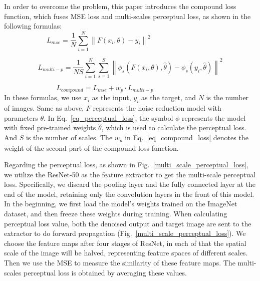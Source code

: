 \documentclass[conference]{IEEEtran}
\begin{document}
                In order to overcome the problem, this paper introduces the compound loss function, which fuses MSE loss and multi-scales perceptual loss, as shown in the following formulas: 
                \begin{equation}
                    L_{mse} = \frac{1}{N} \sum_{i=1}^N \left\| F\left(x_{i}, \theta\right) - y_{i} \right\|^{2} \qquad\qquad\qquad\qquad\quad \label{eq_mse_loss}
                \end{equation}
                \begin{small}
                    \begin{equation}
                        L_{multi-p} = \frac{1}{NS} \sum_{i=1}^{N} \sum_{s=1}^S \left\|\phi_s\left(F\left(x_{i}, \theta\right), \hat{\theta}\right)-\phi_s\left(y_{i}, \hat{\theta}\right)\right\|^{2} \label{eq_perceptual_loss}
                    \end{equation}
                \end{small}
                \begin{equation}
                    L_{compound} = L_{mse} + w_{p} \cdot L_{multi-p} \qquad\qquad\qquad\quad ~ \label{eq_compound_loss}
                \end{equation}
                In these formulas, we use $x_{i}$ as the input, $y_{i}$ as the target, and $N$ is the number of images.
                Same as above, $F$ represents the noise reduction model with parameters $\theta$.
                In Eq.~\ref{eq_perceptual_loss}, the symbol $\phi$ represents the model with fixed pre-trained weights $\hat{\theta}$, which is used to calculate the perceptual loss.
                And $S$ is the number of scales. 
                The $w_{p}$ in Eq.~\ref{eq_compound_loss} denotes the weight of the second part of the compound loss function.

                Regarding the perceptual loss, as shown in Fig.~\ref{multi_scale_perceptual_loss}, we utilize the ResNet-50\cite{He_2016_CVPR} as the feature extractor to get the multi-scale perceptual loss.
                Specifically, we discard the pooling layer and the fully connected layer at the end of the model, retaining only the convolution layers in the front of this model.
                In the beginning, we first load the model's weights trained on the ImageNet dataset\cite{5206848}, and then freeze these weights during training.
                When calculating perceptual loss value, both the denoised output and target image are sent to the extractor to do forward propagation (Fig.~\ref{multi_scale_perceptual_loss}).
                We choose the feature maps after four stages of ResNet, in each of that the spatial scale of the image will be halved, representing feature spaces of different scales.
                Then we use the MSE to measure the similarity of these feature maps.
                The multi-scales perceptual loss is obtained by averaging these values.
\end{document}

